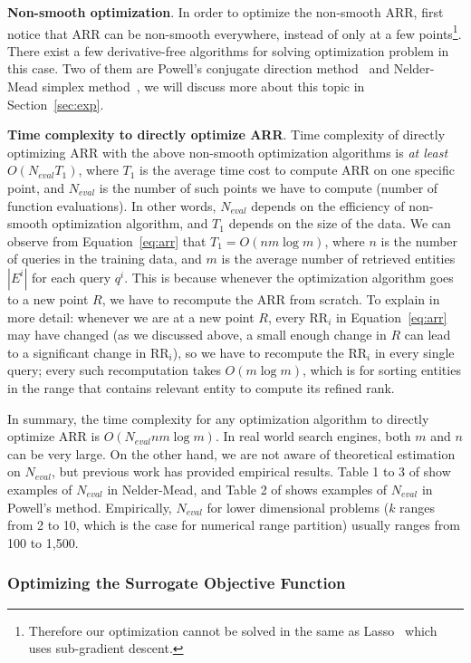 \textbf{Non-smooth optimization}. In order to optimize the non-smooth ARR, first notice that ARR can be non-smooth everywhere, instead of only at a few points\footnote{Therefore our optimization cannot be solved in the same as Lasso~\cite{tibshirani1996regression} which uses sub-gradient descent.}. There exist a few derivative-free algorithms for solving optimization problem in this case. Two of them are Powell's conjugate direction method~\cite{brent73} and Nelder-Mead simplex method~\cite{Nelder1965}, we will discuss more about this topic in Section~\ref{sec:exp}.

\textbf{Time complexity to directly optimize ARR}. Time complexity of directly optimizing ARR with the above non-smooth optimization algorithms is \emph{at least} $O(N_{eval} T_1)$, where $T_1$ is the average time cost to compute ARR on one specific point, and $N_{eval}$ is the number of such points we have to compute (number of function evaluations). In other words, $N_{eval}$ depends on the efficiency of non-smooth optimization algorithm, and $T_1$ depends on the size of the data. We can observe from Equation~\ref{eq:arr} that $T_1 = O(n m\log{m})$, where $n$ is the number of queries in the training data, and $m$ is the average number of retrieved entities $|E^i|$ for each query $q^i$. This is because whenever the optimization algorithm goes to a new point $R$, we have to recompute the ARR from scratch. To explain in more detail: whenever we are at a new point $R$, every RR$_i$ in Equation~\ref{eq:arr} may have changed (as we discussed above, a small enough change in $R$ can lead to a significant change in RR$_i$), so we have to recompute the RR$_i$ in every single query; every such recomputation takes $O(m\log{m})$, which is for sorting entities in the range that contains relevant entity to compute its refined rank. 

In summary, the time complexity for any optimization algorithm to directly optimize ARR is $O(N_{eval}nm\log{m})$. In real world search engines, both $m$ and $n$ can be very large. On the other hand, we are not aware of theoretical estimation on $N_{eval}$, but previous work has provided empirical results. Table 1 to 3 of \cite{journals/coap/GaoH12} show examples of $N_{eval}$ in Nelder-Mead, and Table 2 of \cite{AROUXET2011} shows examples of $N_{eval}$ in Powell's method. Empirically, $N_{eval}$ for lower dimensional problems ($k$ ranges from 2 to 10, which is the case for numerical range partition) usually ranges from 100 to 1,500. 

\subsubsection{Optimizing the Surrogate Objective Function}
\label{sec:surrogate}

